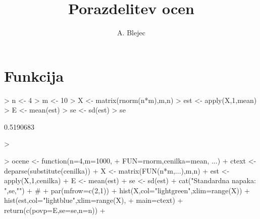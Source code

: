 \documentclass[a4paper,12pt]{article}
\begin{document}
\title{Porazdelitev ocen}
\author{A. Blejec}
%

\maketitle
\tableofcontents

\section{Funkcija}

\begin{Schunk}
\begin{Sinput}
> n <- 4
> m <- 10
> X <- matrix(rnorm(n*m),m,n)
> est <- apply(X,1,mean)
> E <- mean(est)
> se <- sd(est)
> se
\end{Sinput}
\begin{Soutput}
[1] 0.5190683
\end{Soutput}
\begin{Sinput}
> 
\end{Sinput}
\end{Schunk}

\begin{Schunk}
\begin{Sinput}
> ocene <- function(n=4,m=1000, 
+ FUN=rnorm,cenilka=mean, ...){
+ ctext <- deparse(substitute(cenilka))
+ X <- matrix(FUN(n*m,...),m,n)
+ est <- apply(X,1,cenilka)
+ E <- mean(est)
+ se <- sd(est)
+ cat("Standardna napaka: \n",se,"\n")
+ #
+ par(mfrow=c(2,1))
+ hist(X,col="lightgreen",xlim=range(X))
+ hist(est,col="lightblue",xlim=range(X),
+ main=ctext)
+ return(c(povp=E,se=se,n=n))
+ }
\end{Sinput}
\end{Schunk}
\end{document}

